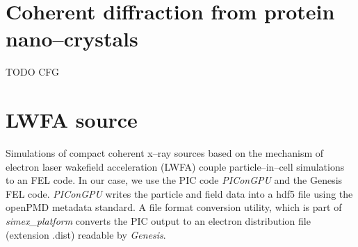 \documentclass[12pt]{scrartcl}
\begin{document}
\section{Coherent diffraction from protein nano--crystals\label{sec:protein_sfx}}
TODO CFG
%
\section{LWFA source}\label{sec:lwfa_source}
Simulations of compact coherent x--ray sources based on the mechanism of
electron laser wakefield acceleration (LWFA) couple particle--in--cell
simulations to an FEL code. In our case, we use the PIC code \textit{PIConGPU}
and the Genesis FEL code. \textit{PIConGPU} writes the particle and field data
into a hdf5 file using the openPMD \cite{Huebl2015} metadata standard. A file format conversion utility, which is part of
\textit{simex\_platform} converts the PIC output to an electron distribution
file (extension .dist) readable by \textit{Genesis}.

\printbibliography[notkeyword=report, notkeyword=zenodo, title={Journal articles}]
%
\printbibliography[keyword=eucall, keyword=report, title={EUCALL Reports}]
%
\printbibliography[keyword=zenodo, title={EUCALL Data Repository Depositions}]
\end{document}
